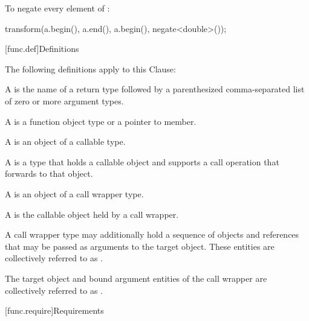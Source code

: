 \pnum
\begin{example}
To negate every element of :

\begin{codeblock}
transform(a.begin(), a.end(), a.begin(), negate<double>());
\end{codeblock}

\end{example}

[func.def]{Definitions}

\pnum
The following definitions apply to this Clause:

\pnum
A  is the name of a return type followed by a
parenthesized comma-separated list of zero or more argument types.

\pnum
A  is a function object type or a pointer to member.

\pnum
A  is an object of a callable type.

\pnum
A  is a type that holds a callable object
and supports a call operation that forwards to that object.

\pnum
A  is an object of a call wrapper type.

\pnum
A  is the callable object held by a call wrapper.

\pnum
A call wrapper type may additionally hold
a sequence of objects and references
that may be passed as arguments to the target object.
These entities are collectively referred to
as .

\pnum
The target object and bound argument entities of the call wrapper are
collectively referred to as .

[func.require]{Requirements}

